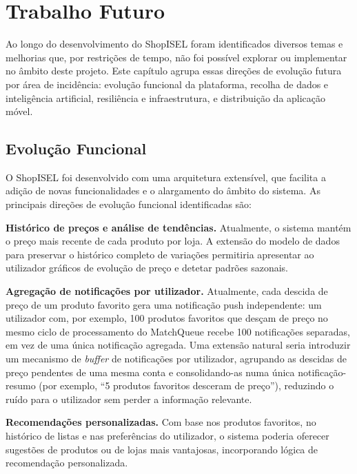 
\chapter{Trabalho Futuro}
\label{chap:7}

Ao longo do desenvolvimento do ShopISEL foram identificados diversos temas e melhorias que, por restrições de tempo, não foi possível explorar ou implementar no âmbito deste projeto. Este capítulo agrupa essas direções de evolução futura por área de incidência: evolução funcional da plataforma, recolha de dados e inteligência artificial, resiliência e infraestrutura, e distribuição da aplicação móvel.

\section{Evolução Funcional}
\label{sec:7.1}

O ShopISEL foi desenvolvido com uma arquitetura extensível, que facilita a adição de novas funcionalidades e o alargamento do âmbito do sistema. As principais direções de evolução funcional identificadas são:

\textbf{Histórico de preços e análise de tendências.} Atualmente, o sistema mantém o preço mais recente de cada produto por loja. A extensão do modelo de dados para preservar o histórico completo de variações permitiria apresentar ao utilizador gráficos de evolução de preço e detetar padrões sazonais.

\textbf{Agregação de notificações por utilizador.} Atualmente, cada descida de preço de um produto favorito gera uma notificação push independente: um utilizador com, por exemplo, 100 produtos favoritos que desçam de preço no mesmo ciclo de processamento do MatchQueue recebe 100 notificações separadas, em vez de uma única notificação agregada. Uma extensão natural seria introduzir um mecanismo de \textit{buffer} de notificações por utilizador, agrupando as descidas de preço pendentes de uma mesma conta e consolidando-as numa única notificação-resumo (por exemplo, ``5 produtos favoritos desceram de preço''), reduzindo o ruído para o utilizador sem perder a informação relevante.

\textbf{Recomendações personalizadas.} Com base nos produtos favoritos, no histórico de listas e nas preferências do utilizador, o sistema poderia oferecer sugestões de produtos ou de lojas mais vantajosas, incorporando lógica de recomendação personalizada.

